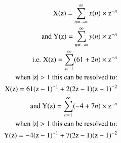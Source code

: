 \documentclass[journal,12pt,twocolumn]{IEEEtran}
\theoremstyle{remark}
\begin{document}
\begin{align}
\text{X(z)} = \sum_{n=-\infty}^{\infty} x(n)\times \text{z}^{-n}\\
\text{and Y(z)} = \sum_{n=-\infty}^{\infty} y(n)\times \text{z}^{-n}\\
\notag \text{i.e. X(z)} = \sum_{n=1}^{\infty} (61 + 2n)\times \text{z}^{-n}\\
\notag \text{when $ |\text{z}|>1$ this can be resolved to:}\\
\text{X(z)} = 61(\text{z}-1)^{-1} + 2(2\text{z}-1)(\text{z}-1)^{-2}\\
\notag \text{and Y(z)} = \sum_{n=1}^{\infty} (-4 + 7n)\times \text{z}^{-n}\\
\notag \text{when $ |\text{z}|>1$ this can be resolved to:}\\
\text{Y(z)} = -4(\text{z}-1)^{-1} + 7(2\text{z}-1)(\text{z}-1)^{-2}\end{align}
\end{document}
